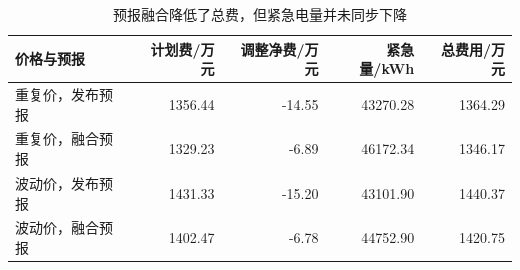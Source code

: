 \begin{table}[H]
\centering\small
\caption{预报融合降低了总费，但紧急电量并未同步下降}
\label{tab:blend_results}
\begin{tabular}{lrrrr}\toprule
价格与预报 & 计划费/万元 & 调整净费/万元 & 紧急量/kWh & 总费用/万元 \\\midrule
重复价，发布预报 & 1356.44 & -14.55 & 43270.28 & 1364.29 \\
重复价，融合预报 & 1329.23 & -6.89 & 46172.34 & 1346.17 \\
波动价，发布预报 & 1431.33 & -15.20 & 43101.90 & 1440.37 \\
波动价，融合预报 & 1402.47 & -6.78 & 44752.90 & 1420.75 \\
\bottomrule\end{tabular}
\end{table}
